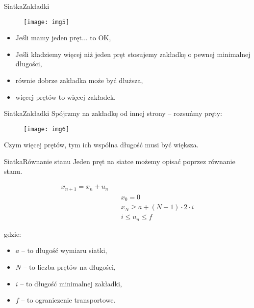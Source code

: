 \documentclass[11pt]{beamer}
\begin{document}
\begin{frame}{Siatka}{Zakładki}
\begin{figure}[h!]
	\centering
	\texttt{[image: img5]}
\end{figure}

\begin{itemize}
\item<1-> Jeśli mamy jeden pręt... to OK,
\item<2-> Jeśli kładziemy więcej niż jeden pręt stosujemy zakładkę o pewnej minimalnej długości,
\item<3-> równie dobrze zakładka może być dłuższa,
\item<4-> więcej prętów to więcej zakładek.
\end{itemize}
\end{frame}

\begin{frame}{Siatka}{Zakładki}
Spójrzmy na zakładkę od innej strony -- rozsuńmy pręty:
\begin{figure}[h!]
	\centering
	\texttt{[image: img6]}
\end{figure}

\pause

Czym więcej prętów, tym ich wspólna długość musi być większa.

\end{frame}


\begin{frame}{Siatka}{Równanie stanu}
Jeden pręt na siatce możemy opisać poprzez równanie stanu.

\pause

\begin{align*}
x_{n+1} = x_n + u_n \quad & \\
& x_0 = 0 \\
& x_N  \ge a + (N - 1) \cdot 2 \cdot i \\
& i \le u_n \le f
\end{align*}

gdzie:
\begin{itemize}
\item[ ] $a$ -- to długość wymiaru siatki,
\item[ ] $N$ -- to liczba prętów na długości,
\item[ ] $i$ -- to długość minimalnej zakładki,
\item[ ] $f$ -- to ograniczenie transportowe.
\end{itemize}
\end{frame}
\end{document}
